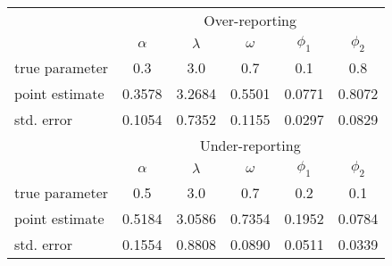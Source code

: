 \documentclass[12pt,twoside, A4paper]{article}
\begin{document}
\begin{table}[ht]
\begin{center}
\begin{tabular}{lccccc}
\hline
& \multicolumn{5}{c}{Over-reporting}\\
& $\alpha$&$\lambda$&$\omega$&$\phi_1$&$\phi_2$\\
 \hline
true parameter & 0.3 & 3.0 & 0.7& 0.1& 0.8\\
point estimate & 0.3578 & 3.2684 & 0.5501 & 0.0771 &0.8072 \\
std. error &  0.1054 & 0.7352 & 0.1155 & 0.0297 & 0.0829 \\
\hline \hline 
& \multicolumn{5}{c}{Under-reporting}\\
& $\alpha$&$\lambda$&$\omega$&$\phi_1$&$\phi_2$\\
 \hline
true parameter & 0.5 & 3.0 & 0.7& 0.2& 0.1\\
point estimate & 0.5184 & 3.0586 &  0.7354 & 0.1952  & 0.0784 \\
std. error & 0.1554 & 0.8808 & 0.0890 & 0.0511 & 0.0339 \\
\hline 
\end{tabular}
\end{center}
\end{table}


\end{document}

